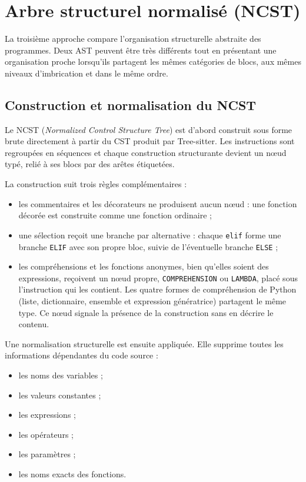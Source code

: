 \documentclass[12pt,a4paper,oneside]{report}
\begin{document}
\section{Arbre structurel normalisé (NCST)}

La troisième approche compare l'organisation structurelle abstraite des
programmes. Deux AST peuvent être très différents tout en présentant une
organisation proche lorsqu'ils partagent les mêmes catégories de blocs, aux
mêmes niveaux d'imbrication et dans le même ordre.

\subsection{Construction et normalisation du NCST}

Le NCST (\emph{Normalized Control Structure Tree}) est d'abord construit sous
forme brute directement à partir du CST produit par Tree-sitter. Les
instructions sont regroupées en séquences et chaque construction structurante
devient un nœud typé, relié à ses blocs par des arêtes étiquetées.

La construction suit trois règles complémentaires :
\begin{itemize}
  \item les commentaires et les décorateurs ne produisent aucun nœud : une
        fonction décorée est construite comme une fonction ordinaire ;
  \item une sélection reçoit une branche par alternative : chaque
        \texttt{elif} forme une branche \texttt{ELIF} avec son propre bloc,
        suivie de l'éventuelle branche \texttt{ELSE} ;
  \item les compréhensions et les fonctions anonymes, bien qu'elles soient
        des expressions, reçoivent un nœud propre, \texttt{COMPREHENSION} ou
        \texttt{LAMBDA}, placé sous l'instruction qui les contient. Les quatre
        formes de compréhension de Python (liste, dictionnaire, ensemble et
        expression génératrice) partagent le même type. Ce nœud signale la
        présence de la construction sans en décrire le contenu.
\end{itemize}

Une normalisation structurelle est ensuite appliquée. Elle supprime toutes les
informations dépendantes du code source :
\begin{itemize}
  \item les noms des variables ;
  \item les valeurs constantes ;
  \item les expressions ;
  \item les opérateurs ;
  \item les paramètres ;
  \item les noms exacts des fonctions.
\end{itemize}
\end{document}
